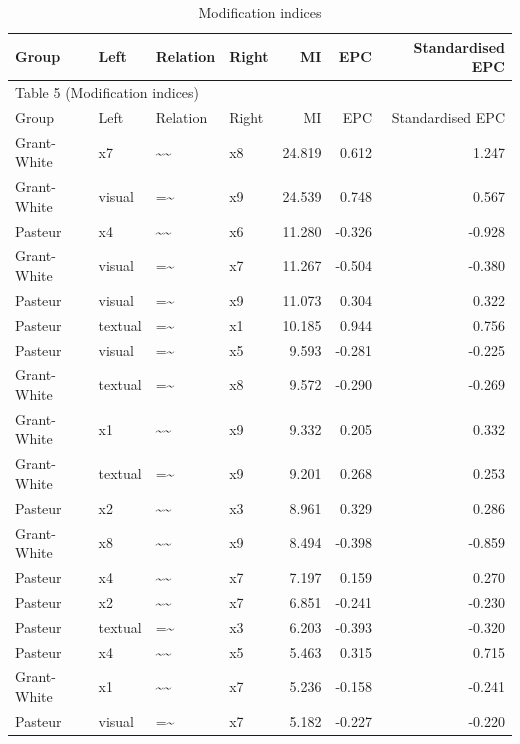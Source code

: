\documentclass[11pt]{article}
\begin{document}
\small
\begin{longtable}{llllrrr}
\caption{Modification indices}\\
\toprule
Group & Left & Relation & Right & MI & EPC & Standardised EPC \\
\midrule
\endfirsthead
\multicolumn{7}{l}{Table 5 (Modification indices)} \\
\toprule
Group & Left & Relation & Right & MI & EPC & Standardised EPC \\
\midrule
\endhead
Grant-White & x7 & \textasciitilde{}\textasciitilde{} & x8 & 24.819 & 0.612 & 1.247 \\
Grant-White & visual & =\textasciitilde{} & x9 & 24.539 & 0.748 & 0.567 \\
Pasteur & x4 & \textasciitilde{}\textasciitilde{} & x6 & 11.280 & -0.326 & -0.928 \\
Grant-White & visual & =\textasciitilde{} & x7 & 11.267 & -0.504 & -0.380 \\
Pasteur & visual & =\textasciitilde{} & x9 & 11.073 & 0.304 & 0.322 \\
Pasteur & textual & =\textasciitilde{} & x1 & 10.185 & 0.944 & 0.756 \\
Pasteur & visual & =\textasciitilde{} & x5 & 9.593 & -0.281 & -0.225 \\
Grant-White & textual & =\textasciitilde{} & x8 & 9.572 & -0.290 & -0.269 \\
Grant-White & x1 & \textasciitilde{}\textasciitilde{} & x9 & 9.332 & 0.205 & 0.332 \\
Grant-White & textual & =\textasciitilde{} & x9 & 9.201 & 0.268 & 0.253 \\
Pasteur & x2 & \textasciitilde{}\textasciitilde{} & x3 & 8.961 & 0.329 & 0.286 \\
Grant-White & x8 & \textasciitilde{}\textasciitilde{} & x9 & 8.494 & -0.398 & -0.859 \\
Pasteur & x4 & \textasciitilde{}\textasciitilde{} & x7 & 7.197 & 0.159 & 0.270 \\
Pasteur & x2 & \textasciitilde{}\textasciitilde{} & x7 & 6.851 & -0.241 & -0.230 \\
Pasteur & textual & =\textasciitilde{} & x3 & 6.203 & -0.393 & -0.320 \\
Pasteur & x4 & \textasciitilde{}\textasciitilde{} & x5 & 5.463 & 0.315 & 0.715 \\
Grant-White & x1 & \textasciitilde{}\textasciitilde{} & x7 & 5.236 & -0.158 & -0.241 \\
Pasteur & visual & =\textasciitilde{} & x7 & 5.182 & -0.227 & -0.220 \\

\end{longtable}
\end{document}
